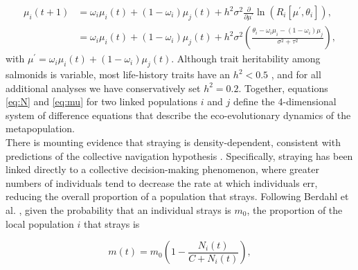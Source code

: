 \documentclass{revtex4}
\begin{document}
\begin{align}
  \label{eq:mu}
  \mu_i(t+1) &= \omega_i\mu_i(t) + (1-\omega_i)\mu_j(t) + h^2\sigma^2\frac{\partial}{\partial \mu^\prime}\ln\left(R_i[\mu^\prime,\theta_i] \right), \\ \nonumber
  &= \omega_i\mu_i(t) + (1-\omega_i)\mu_j(t) + h^2\sigma^2\left(\frac{\theta_i - \omega_i\mu_i - (1-\omega_i)\mu_j}{\sigma^2+\tau^2} \right),
\end{align}
with $\mu^\prime = \omega_i \mu_i(t)+ (1-\omega_i)\mu_j(t)$.
Although trait heritability among salmonids is variable, most life-history traits have an $h^2 < 0.5$ \citep{Carlson:2008hl}, and for all additional analyses we have conservatively set $h^2=0.2$.
Together, equations \ref{eq:N} and \ref{eq:mu} for two linked populations $i$ and $j$ define the 4-dimensional system of difference equations that describe the eco-evolutionary dynamics of the metapopulation. \\


\noindent There is mounting evidence that straying is density-dependent, consistent with predictions of the collective navigation hypothesis \citep{Berdahl:2014bl,Berdahl:2017uu}.
Specifically, straying has been linked directly to a collective decision-making phenomenon, where greater numbers of individuals tend to decrease the rate at which individuals err, reducing the overall proportion of a population that strays.
Following Berdahl et al. \citep{Berdahl:2016dx}, given the probability that an individual strays is $m_0$, the proportion of the local population $i$ that strays is

\begin{equation}
  m(t) = m_0\left(1- \frac{N_i(t)}{C+N_i(t)}\right),
  \label{eq:ddm}
\end{equation}
\end{document}
